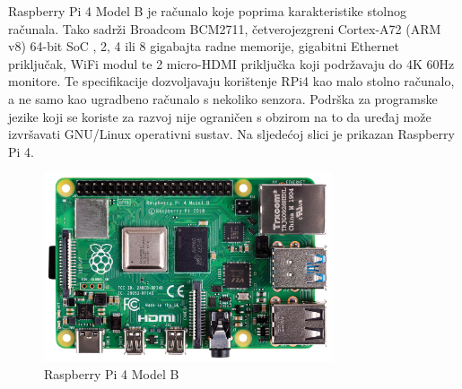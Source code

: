 \documentclass[times, utf8, diplomski]{fer}
\begin{document}
Raspberry Pi 4 Model B\citep{RPi4} je računalo koje poprima karakteristike stolnog računala. Tako sadrži Broadcom BCM2711, četverojezgreni Cortex-A72 (ARM v8) 64-bit SoC , 2, 4 ili 8 gigabajta radne memorije, gigabitni Ethernet priključak, WiFi modul te 2 micro-HDMI priključka koji podržavaju do 4K 60Hz monitore. Te specifikacije dozvoljavaju korištenje RPi4 kao malo stolno računalo, a ne samo kao ugradbeno računalo s nekoliko senzora. Podrška za programske jezike koji se koriste za razvoj nije ograničen s obzirom na to da uređaj može izvršavati GNU/Linux operativni sustav. Na sljedećoj slici je prikazan Raspberry Pi 4.
\begin{figure}[htb]
    \centering
    \includegraphics[width=8.5cm]{images/rpi4.jpg}
    \caption{Raspberry Pi 4 Model B\citep{RPi4Img}}
    \label{fig:rpi4}
\end{figure}
\end{document}
